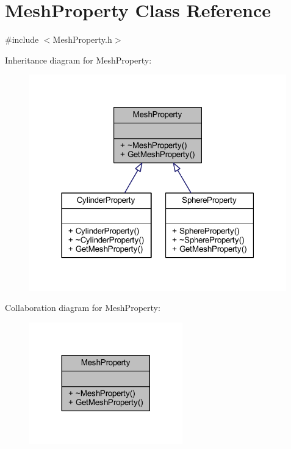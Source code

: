 \hypertarget{class_mesh_property}{}\section{Mesh\+Property Class Reference}
\label{class_mesh_property}


{\ttfamily \#include $<$Mesh\+Property.\+h$>$}



Inheritance diagram for Mesh\+Property\+:
\nopagebreak
\begin{figure}[H]
\begin{center}
\leavevmode
\includegraphics[width=316pt]{class_mesh_property__inherit__graph}
\end{center}
\end{figure}


Collaboration diagram for Mesh\+Property\+:
\nopagebreak
\begin{figure}[H]
\begin{center}
\leavevmode
\includegraphics[width=188pt]{class_mesh_property__coll__graph}
\end{center}
\end{figure}
